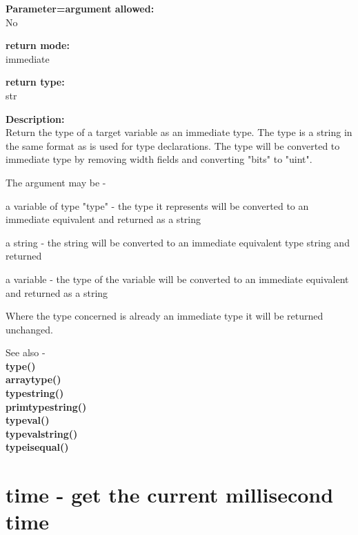         {\bf Parameter=argument allowed:} \\
        No
        
        {\bf return mode:} \\
        immediate

        {\bf return type:} \\
        str
        
        {\bf Description:} \\
        Return the type of a target variable as an immediate type. The type is a
        string in the same format as is used for type declarations. The type
        will be converted to immediate type by removing width fields and converting
        "bits" to "uint".
        
        The argument may be -
        \blist
        \item   a variable of type "type" - the type it represents will
                be converted to an immediate equivalent and returned
                as a string
        \item   a string - the string will be converted to an immediate
                equivalent type string and returned
        \item   a variable - the type of the variable will be converted
                to an immediate equivalent and returned as a string
        \blend
        
        Where the type concerned is already an immediate type it will
        be returned unchanged.
        
        See also - \\
        {\bf type()}  \\
        {\bf arraytype()}  \\
        {\bf typestring()}  \\
        {\bf primtypestring()}  \\
        {\bf typeval()}  \\
        {\bf typevalstring()}  \\
        {\bf typeisequal()}  \\
 

    \section{time - get the current millisecond time}\label{sec:iftime}
        
